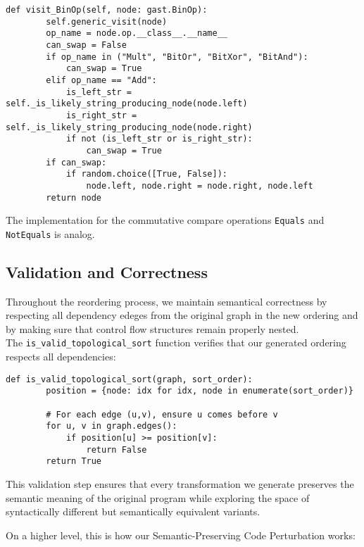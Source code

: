 \documentclass[%
thesis=student,%
coverpage=false,%
titlepage=false,%
headmarks=true, %
english,%
font=libertine, %
math=newpxtx, %
BCOR=5mm,%
coverBCOR=11mm%
]{tum-templates/book/tumbook}
\begin{document}
\begin{lstlisting}[style=pythonstyle, caption={Swapping of commutative binary operations}]
def visit_BinOp(self, node: gast.BinOp):
        self.generic_visit(node)
        op_name = node.op.__class__.__name__
        can_swap = False
        if op_name in ("Mult", "BitOr", "BitXor", "BitAnd"): 
            can_swap = True
        elif op_name == "Add":
            is_left_str = self._is_likely_string_producing_node(node.left)
            is_right_str = self._is_likely_string_producing_node(node.right)
            if not (is_left_str or is_right_str):
                can_swap = True 
        if can_swap:
            if random.choice([True, False]):
                node.left, node.right = node.right, node.left
        return node
\end{lstlisting}
The implementation for the commutative compare operations \texttt{Equals} and \texttt{NotEquals} is analog. 

\subsection{Validation and Correctness}

Throughout the reordering process, we maintain semantical correctness by respecting all dependency edeges from the original graph in the new ordering and by making sure that control flow structures remain properly nested. \\

The \texttt{is\_valid\_topological\_sort} function verifies that our generated ordering respects all dependencies:

\newpage
\begin{lstlisting}[style=pythonstyle, caption={Sanity check if the created neighborhood sort is still a valid topological sort}]
def is_valid_topological_sort(graph, sort_order):
        position = {node: idx for idx, node in enumerate(sort_order)}
        
        # For each edge (u,v), ensure u comes before v
        for u, v in graph.edges():
            if position[u] >= position[v]:
                return False
        return True
\end{lstlisting}
This validation step ensures that every transformation we generate preserves the semantic meaning of the original program while exploring the space of syntactically different but semantically equivalent variants.

On a higher level, this is how our Semantic-Preserving Code Perturbation works:
\end{document}

